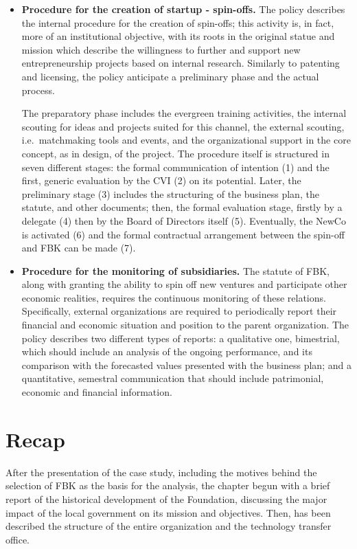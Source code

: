 \begin{itemize}
\item \textbf{Procedure for the creation of startup - spin-offs.} The policy describes the internal procedure for the creation of spin-offs; this activity is, in fact, more of an institutional objective, with its roots in the original statue and mission which describe the willingness to further and support new entrepreneurship projects based on internal research. Similarly to patenting and licensing, the policy anticipate a preliminary phase and the actual process.

The preparatory phase includes the evergreen training activities, the internal scouting for ideas and projects suited for this channel, the external scouting, i.e.\ matchmaking tools and events, and the organizational support in the core concept, as in design, of the project. The procedure itself is structured in seven different stages: the formal communication of intention (1) and the first, generic evaluation by the CVI (2) on its potential. Later, the preliminary stage (3) includes the structuring of the business plan, the statute, and other documents; then, the formal evaluation stage, firstly by a delegate (4) then by the Board of Directors itself (5). Eventually, the NewCo is activated (6) and the formal contractual arrangement between the spin-off and FBK can be made (7).

\item \textbf{Procedure for the monitoring of subsidiaries.} The statute of FBK, along with granting the ability to spin off new ventures and participate other economic realities, requires the continuous monitoring of these relations. Specifically, external organizations are required to periodically report their financial and economic situation and position to the parent organization. The policy describes two different types of reports: a qualitative one, bimestrial, which should include an analysis of the ongoing performance, and its comparison with the forecasted values presented with the business plan; and a quantitative, semestral communication that should include patrimonial, economic and financial information.

\end{itemize} 

\section{Recap}

After the presentation of the case study, including the motives behind the selection of FBK as the basis for the analysis, the chapter begun with a brief report of the historical development of the Foundation, discussing the major impact of the local government on its mission and objectives. Then, has been described the structure of the entire organization and the technology transfer office. 

